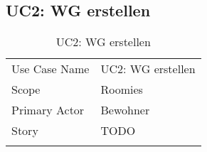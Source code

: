 \subsection{UC2: WG erstellen}
\begin{table}[H]
	\tablestyle
	\tablealtcolored
	\begin{tabularx}{\textwidth}{lX}
		\tablebody
			Use Case Name &
			UC2: WG erstellen
			\tabularnewline
			Scope &
			Roomies
			\tabularnewline
			Primary Actor &
			Bewohner
			\tabularnewline
			Story &
			TODO
			\tabularnewline
		\tableend
	\end{tabularx}
	\caption{UC2: WG erstellen}
\end{table}


